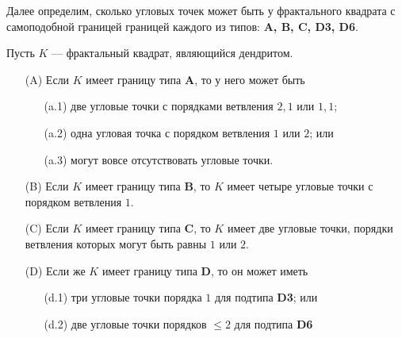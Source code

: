 Далее определим, сколько угловых точек может быть у фрактального квадрата с самоподобной границей границей каждого из типов: {\bf A, B, C, D3, D6}.

\begin{theorem}\label{thm:corner}
Пусть $K$ --- фрактальный квадрат, являющийся дендритом.
\begin{itemize}[nolistsep]
\item[(A)] Если $K$ имеет границу типа  {\bf A}, то у него может быть
	\begin{itemize}[nolistsep]
	\item[(a.1)] две угловые точки с порядками ветвления $2,1$ или $1,1$;
	\item[(a.2)] одна угловая точка с порядком ветвления $1$ или $2$; или 
	\item[(a.3)] могут вовсе отсутствовать угловые точки.
	\end{itemize}
\item[(B)] Если $K$ имеет границу типа  {\bf B}, то $K$ имеет четыре угловые точки с порядком ветвления $1$.
\item[(C)] Если $K$ имеет границу типа {\bf C}, то $K$ имеет две угловые точки, порядки ветвления которых могут быть равны $1$ или $2$.
\item[(D)] Если же $K$ имеет границу типа {\bf D}, то он может иметь 
	\begin{itemize}[nolistsep]
	\item[(d.1)] три угловые точки порядка $1$ для подтипа {\bf D3}; или
	\item[(d.2)] две угловые точки порядков $\le 2$ для подтипа {\bf D6}
	\end{itemize}
\end{itemize}
\end{theorem}


